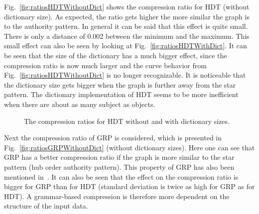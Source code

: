 Fig.~\ref{fig:ratiosHDTWithoutDict} shows the compression ratio for HDT (without dictionary size). As expected, the ratio gets higher the more similar the graph is to the authority pattern. In general it can be said that this effect is quite small. There is only a distance of 0.002 between the minimum and the maximum. This small effect can also be seen by looking at Fig.~\ref{fig:ratiosHDTWithDict}. It can be seen that the size of the dictionary has a much bigger effect, since the compression ratio is now much larger and the curve behavior from Fig.~\ref{fig:ratiosHDTWithoutDict} is no longer recognizable. It is noticeable that the dictionary size gets bigger when the graph is further away from the star pattern. The dictionary implementation of HDT seems to be more inefficient when there are about as many subject as objects. 


\begin{figure}[h]
	\centering
	\hfill
	\caption{The compression ratios for HDT without and with dictionary sizes.}
\end{figure}

Next the compression ratio of GRP is considered, which is presented in Fig.~\ref{fig:ratiosGRPWithoutDict} (without dictionary sizes). Here one can see that GRP has a better compression ratio if the graph is more similar to the star pattern (hub order authority pattern). This property of GRP has also been mentioned in~\cite{maneth}. It can also be seen that the effect on the compression ratio is bigger for GRP than for HDT (standard deviation is twice as high for GRP as for HDT). A grammar-based compression is therefore more dependent on the structure of the input data.

